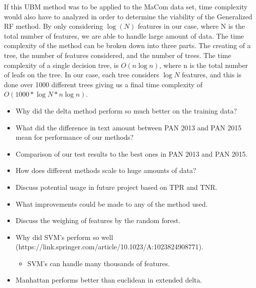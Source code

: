 If this \gls{UBM} method was to be applied to the MaCom data set, time complexity would
also have to analyzed in order to determine the viability of the Generalized RF 
method.
By only considering $\log(N)$ features in our case, 
where N is the total number of features, we are able to handle large amount of data. 
The time complexity of the method can be broken down into three parts.
The creating of a tree, the number of features considered, and the number of trees.
The time complexity of a single decision tree, is $O(n \log{n})$, where n is the
total number of leafs on the tree. In our case,
each tree considers $\log{N}$ features, and this is done over 1000 different
trees giving us a final time complexity of $O(1000 * \log{N} * n \log{n})$.\cite{RFTime}






\begin{itemize}
    \item Why did the delta method perform so much better on the training data?
    \item What did the difference in text amount between PAN 2013 and PAN 2015
        mean for performance of our methods?
    \item Comparison of our test results to the best ones in PAN 2013 and PAN
        2015.
    \item How does different methods scale to huge amounts of data?
    \item Discuss potential usage in future project based on TPR and TNR.
    \item What improvements could be made to any of the method used.
    \item Discuss the weighing of features by the random forest.
    \item Why did SVM's perform so well (https://link.springer.com/article/10.1023/A:1023824908771).
        \begin{itemize}
            \item SVM's can handle many thousands of features.
        \end{itemize}
    \item Manhattan performs better than euclidean in extended delta.
\end{itemize}
